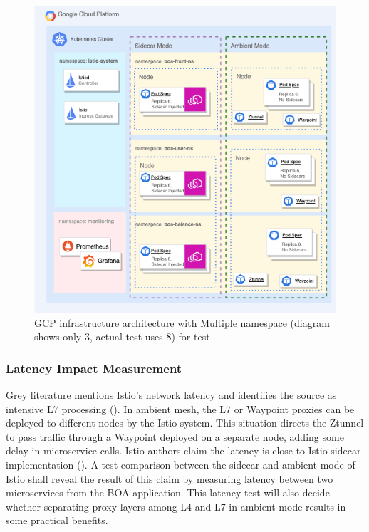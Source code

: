 \begin{figure}[ht!]
    \centering
    \includegraphics[width=0.7\linewidth]{resources/multi-ns-test-infra.drawio.png}
    \caption{GCP infrastructure architecture with Multiple namespace (diagram shows only 3, actual test uses 8) for test}
    \label{method:multiNsInfraArch}
\end{figure}

\subsubsection{Latency Impact Measurement}
Grey literature mentions Istio’s network latency and identifies the source as intensive L7 processing (\cite{istioHoward2022}). In ambient mesh, the L7 or Waypoint proxies can be deployed to different nodes by the Istio system. This situation directs the Ztunnel to pass traffic through a Waypoint deployed on a separate node, adding some delay in microservice calls. Istio authors claim the latency is close to Istio sidecar implementation (\cite{istioHoward2022}). A test comparison between the sidecar and ambient mode of Istio shall reveal the result of this claim by measuring latency between two microservices from the BOA application. This latency test will also decide whether separating proxy layers among L4 and L7 in ambient mode results in some practical benefits.

